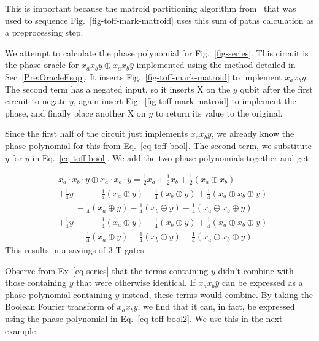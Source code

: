 This is important because the matroid partitioning algorithm from~\cite{bib-amy-matroid}
that was used to sequence Fig.~\ref{fig-toff-mark-matroid} uses this sum of paths
calculation as a preprocessing step. 

\begin{example}
  \label{ex-series}
  We attempt to calculate the phase polynomial for Fig.~\ref{fig-series}. This circuit
  is the phase oracle for $x_a x_b y \oplus x_a x_b \bar{y}$ implemented using
  the method detailed in Sec~\ref{Pre:OracleEsop}. It inserts
  Fig.~\ref{fig-toff-mark-matroid} to implement $x_a x_b y$. The second term has a negated
  input, so it inserts X on the $y$ qubit after the first circuit to negate $y$, again
  insert Fig.~\ref{fig-toff-mark-matroid} to implement the phase, and finally place another
  X on $y$ to return its value to the original.

  Since the first half of the circuit just implements $x_a x_b y$, we already know
  the phase polynomial for this from Eq.~\ref{eq-toff-bool}. The second term, we
  substitute $\bar{y}$ for $y$ in Eq.~\ref{eq-toff-bool}. We add the two phase
  polynomials together and get

  \begin{equation}
    \label{eq-series}
    \begin{aligned}
      &x_a \cdot x_b \cdot y \oplus x_a \cdot x_b \cdot \bar{y} = \frac{1}{2}x_a +
      \frac{1}{2}x_b +\frac{1}{2}(x_a \oplus x_b) \\
      & + \frac{1}{4}y \qquad -\frac{1}{4}(x_a \oplus y) - \frac{1}{4}(x_b \oplus y) +
      \frac{1}{4}(x_a \oplus x_b \oplus y)\\
      &\qquad -\frac{1}{4}(x_a \oplus y) - \frac{1}{4}(x_b \oplus y) +
      \frac{1}{4}(x_a \oplus x_b \oplus y)\\
      & + \frac{1}{4}\bar{y} \qquad -\frac{1}{4}(x_a \oplus \bar{y})
      - \frac{1}{4}(x_b \oplus \bar{y}) +
      \frac{1}{4}(x_a \oplus x_b \oplus \bar{y})\\
      &\qquad -\frac{1}{4}(x_a \oplus \bar{y}) - \frac{1}{4}(x_b \oplus \bar{y}) +
      \frac{1}{4}(x_a \oplus x_b \oplus \bar{y})
    \end{aligned}
  \end{equation}
  This results in a savings of 3 T-gates. 
\end{example}

Observe from Ex~\ref{eq-series} that the terms containing $\bar{y}$ didn't combine with
those containing $y$ that were otherwise identical. If $x_a x_b \bar{y}$ can be expressed
as a phase polynomial containing $y$ instead, these terms would combine. By taking the
Boolean Fourier transform of $x_a x_b \bar{y}$, we find that it can, in fact, be expressed
using the phase polynomial in Eq.~\ref{eq-toff-bool2}. We use this in the next example.


